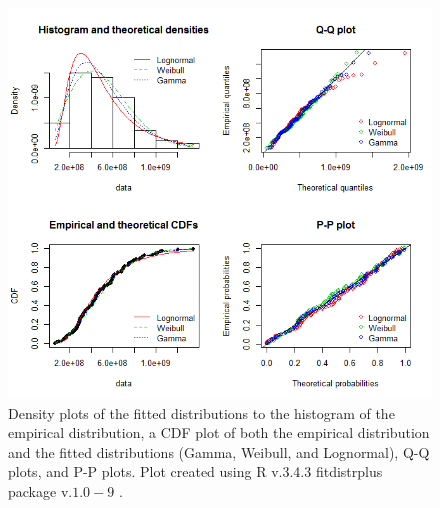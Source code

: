 \documentclass[oneside,12pt,final]{sty/ucthesis-CA2012}
\let\cite\citep                             %
\begin{document}
\begin{mainmatter}
\begin{figure}[H]
     \centering
       \includegraphics[width=.7\textwidth]{fig/Scen2gof2}
    \caption{Density plots of the fitted distributions to the histogram of the empirical distribution, a CDF plot of both the empirical distribution and the fitted distributions (Gamma, Weibull, and Lognormal), Q-Q plots, and P-P plots. Plot created using R v.3.4.3 \cite{Rcite} fitdistrplus package v.$1.0-9$ \cite{fitdistrplus}. }
    \label{SeaWiFSgof2}
\end{figure}


\end{mainmatter}
\end{document}
